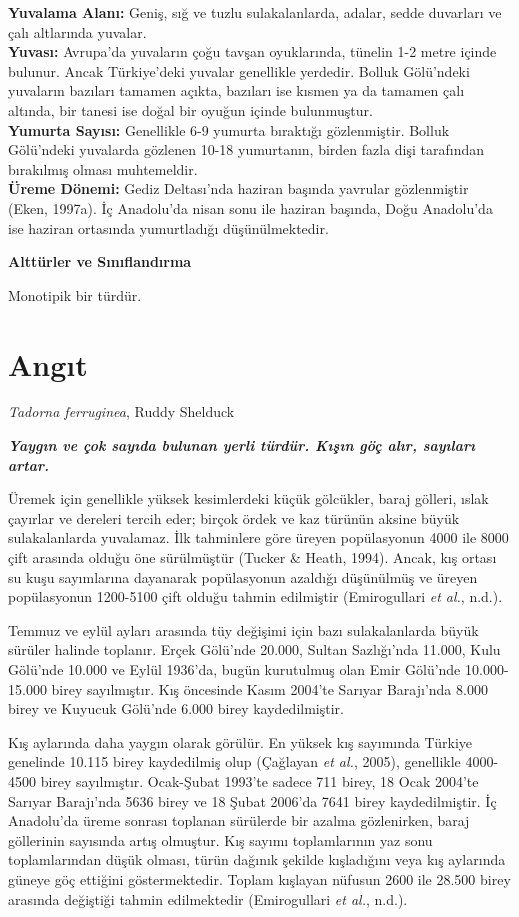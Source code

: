 \documentclass[
  a4paper,
  DIV=11,
  numbers=noendperiod]{scrreprt}
\begin{document}
\textbf{Yuvalama Alanı:} Geniş, sığ ve tuzlu sulakalanlarda, adalar,
sedde duvarları ve çalı altlarında yuvalar.\\
\textbf{Yuvası:} Avrupa'da yuvaların çoğu tavşan oyuklarında, tünelin
1-2 metre içinde bulunur. Ancak Türkiye'deki yuvalar genellikle
yerdedir. Bolluk Gölü'ndeki yuvaların bazıları tamamen açıkta, bazıları
ise kısmen ya da tamamen çalı altında, bir tanesi ise doğal bir oyuğun
içinde bulunmuştur.\\
\textbf{Yumurta Sayısı:} Genellikle 6-9 yumurta bıraktığı gözlenmiştir.
Bolluk Gölü'ndeki yuvalarda gözlenen 10-18 yumurtanın, birden fazla dişi
tarafından bırakılmış olması muhtemeldir.\\
\textbf{Üreme Dönemi:} Gediz Deltası'nda haziran başında yavrular
gözlenmiştir (Eken, 1997a). İç Anadolu'da nisan sonu ile haziran
başında, Doğu Anadolu'da ise haziran ortasında yumurtladığı
düşünülmektedir.

\textbf{Alttürler ve Sınıflandırma}

Monotipik bir türdür.

\section{Angıt}\label{angux131t}

\emph{Tadorna ferruginea}, Ruddy Shelduck

\textbf{\emph{Yaygın ve çok sayıda bulunan yerli türdür. Kışın göç alır,
sayıları artar.}}

Üremek için genellikle yüksek kesimlerdeki küçük gölcükler, baraj
gölleri, ıslak çayırlar ve dereleri tercih eder; birçok ördek ve kaz
türünün aksine büyük sulakalanlarda yuvalamaz. İlk tahminlere göre
üreyen popülasyonun 4000 ile 8000 çift arasında olduğu öne sürülmüştür
(Tucker \& Heath, 1994). Ancak, kış ortası su kuşu sayımlarına dayanarak
popülasyonun azaldığı düşünülmüş ve üreyen popülasyonun 1200-5100 çift
olduğu tahmin edilmiştir (Emirogullari \emph{et al.}, n.d.).

Temmuz ve eylül ayları arasında tüy değişimi için bazı sulakalanlarda
büyük sürüler halinde toplanır. Erçek Gölü'nde 20.000, Sultan
Sazlığı'nda 11.000, Kulu Gölü'nde 10.000 ve Eylül 1936'da, bugün
kurutulmuş olan Emir Gölü'nde 10.000-15.000 birey sayılmıştır. Kış
öncesinde Kasım 2004'te Sarıyar Barajı'nda 8.000 birey ve Kuyucuk
Gölü'nde 6.000 birey kaydedilmiştir.

Kış aylarında daha yaygın olarak görülür. En yüksek kış sayımında
Türkiye genelinde 10.115 birey kaydedilmiş olup (Çağlayan \emph{et al.},
2005), genellikle 4000-4500 birey sayılmıştır. Ocak-Şubat 1993'te sadece
711 birey, 18 Ocak 2004'te Sarıyar Barajı'nda 5636 birey ve 18 Şubat
2006'da 7641 birey kaydedilmiştir. İç Anadolu'da üreme sonrası toplanan
sürülerde bir azalma gözlenirken, baraj göllerinin sayısında artış
olmuştur. Kış sayımı toplamlarının yaz sonu toplamlarından düşük olması,
türün dağınık şekilde kışladığını veya kış aylarında güneye göç ettiğini
göstermektedir. Toplam kışlayan nüfusun 2600 ile 28.500 birey arasında
değiştiği tahmin edilmektedir (Emirogullari \emph{et al.}, n.d.).
\end{document}
